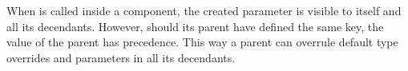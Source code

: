 When  is called inside a component, the created parameter is visible to itself and all its decendants. However, should its parent have defined the same key, the value of the parent has precedence. This way a parent can overrule default type overrides and parameters in all its decendants. 

